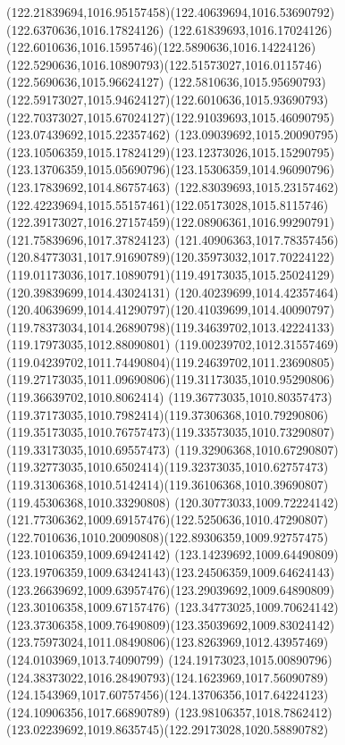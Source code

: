 {    \curveto(122.21839694,1016.95157458)(122.40639694,1016.53690792)(122.6370636,1016.17824126)
    \curveto(122.61839693,1016.17024126)(122.6010636,1016.1595746)(122.5890636,1016.14224126)
    \curveto(122.5290636,1016.10890793)(122.51573027,1016.0115746)(122.5690636,1015.96624127)
    \curveto(122.5810636,1015.95690793)(122.59173027,1015.94624127)(122.6010636,1015.93690793)
    \curveto(122.70373027,1015.67024127)(122.91039693,1015.46090795)(123.07439692,1015.22357462)
    \curveto(123.09039692,1015.20090795)(123.10506359,1015.17824129)(123.12373026,1015.15290795)
    \curveto(123.13706359,1015.05690796)(123.15306359,1014.96090796)(123.17839692,1014.86757463)
    \curveto(122.83039693,1015.23157462)(122.42239694,1015.55157461)(122.05173028,1015.8115746)
    \curveto(122.39173027,1016.27157459)(122.08906361,1016.99290791)(121.75839696,1017.37824123)
    \curveto(121.40906363,1017.78357456)(120.84773031,1017.91690789)(120.35973032,1017.70224122)
    \curveto(119.01173036,1017.10890791)(119.49173035,1015.25024129)(120.39839699,1014.43024131)
    \curveto(120.40239699,1014.42357464)(120.40639699,1014.41290797)(120.41039699,1014.40090797)
    \curveto(119.78373034,1014.26890798)(119.34639702,1013.42224133)(119.17973035,1012.88090801)
    \curveto(119.00239702,1012.31557469)(119.04239702,1011.74490804)(119.24639702,1011.23690805)
    \curveto(119.27173035,1011.09690806)(119.31173035,1010.95290806)(119.36639702,1010.8062414)
    \curveto(119.36773035,1010.80357473)(119.37173035,1010.7982414)(119.37306368,1010.79290806)
    \curveto(119.35173035,1010.76757473)(119.33573035,1010.73290807)(119.33173035,1010.69557473)
    \curveto(119.32906368,1010.67290807)(119.32773035,1010.6502414)(119.32373035,1010.62757473)
    \curveto(119.31306368,1010.5142414)(119.36106368,1010.39690807)(119.45306368,1010.33290808)
    \curveto(120.30773033,1009.72224142)(121.77306362,1009.69157476)(122.5250636,1010.47290807)
    \curveto(122.7010636,1010.20090808)(122.89306359,1009.92757475)(123.10106359,1009.69424142)
    \curveto(123.14239692,1009.64490809)(123.19706359,1009.63424143)(123.24506359,1009.64624143)
    \curveto(123.26639692,1009.63957476)(123.29039692,1009.64890809)(123.30106358,1009.67157476)
    \curveto(123.34773025,1009.70624142)(123.37306358,1009.76490809)(123.35039692,1009.83024142)
    \curveto(123.75973024,1011.08490806)(123.8263969,1012.43957469)(124.0103969,1013.74090799)
    \curveto(124.19173023,1015.00890796)(124.38373022,1016.28490793)(124.1623969,1017.56090789)
    \curveto(124.1543969,1017.60757456)(124.13706356,1017.64224123)(124.10906356,1017.66890789)
    \curveto(123.98106357,1018.7862412)(123.02239692,1019.8635745)(122.29173028,1020.58890782)
}
